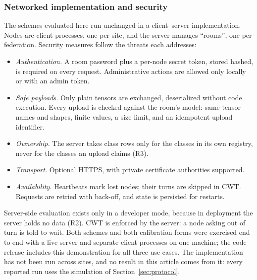 \documentclass[pdflatex,sn-mathphys-num]{sn-jnl}
\begin{document}
\subsubsection{Networked implementation and security}\label{sec:net}
The schemes evaluated here run unchanged in a client--server implementation. Nodes are client processes, one per site, and the server manages ``rooms'', one per federation. Security measures follow the threats each addresses:
\begin{itemize}
\item \emph{Authentication.} A room password plus a per-node secret token, stored hashed, is required on every request. Administrative actions are allowed only locally or with an admin token.
\item \emph{Safe payloads.} Only plain tensors are exchanged, deserialized without code execution. Every upload is checked against the room's model: same tensor names and shapes, finite values, a size limit, and an idempotent upload identifier.
\item \emph{Ownership.} The server takes class rows only for the classes in its own registry, never for the classes an upload claims (R3).
\item \emph{Transport.} Optional HTTPS, with private certificate authorities supported.
\item \emph{Availability.} Heartbeats mark lost nodes; their turns are skipped in CWT. Requests are retried with back-off, and state is persisted for restarts.
\end{itemize}
Server-side evaluation exists only in a developer mode, because in deployment the server holds no data (R2). CWT is enforced by the server: a node asking out of turn is told to wait. Both schemes and both calibration forms were exercised end to end with a live server and separate client processes on one machine; the code release includes this demonstration for all three use cases. The implementation has not been run across sites, and no result in this article comes from it: every reported run uses the simulation of Section~\ref{sec:protocol}.
\end{document}
